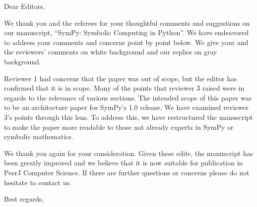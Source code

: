 \documentclass{letter}
\date{September 31, 2016} %
\begin{document}
\begin{letter}{}
\opening{Dear Editors,}

We thank you and the referees for your thoughtful comments and suggestions on
our manuscript, ``SymPy: Symbolic Computing in Python''. We have endeavored to
address your comments and concerns point by point below. We give your
and the reviewers' comments on white background and our replies on gray
background.

Reviewer 1 had concerns that the paper was out of scope, but the editor has
confirmed that it is in scope. Many of the points that reviewer 3 raised were
in regards to the relevance of various sections. The intended scope of this
paper was to be an architecture paper for SymPy's 1.0 release. We have
examined reviewer 3's points through this lens. To address this, we have
restructured the manuscript to make the paper more readable to those not
already experts in SymPy or symbolic mathematics.

We thank you again for your consideration. Given these edits, the manuscript
has been greatly improved and we believe that it is now suitable for
publication in PeerJ Computer Science. If there are further questions or
concerns please do not hesitate to contact us.

\closing{Best regards,\\
 \\
}

\end{letter}
\end{document}
